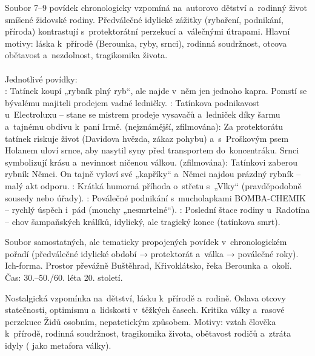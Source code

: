 \documentclass[FGBook.tex]{subfiles}
\begin{document}
\noindent Soubor 7–9 povídek chronologicky vzpomíná na~autorovo dětství a~rodinný život smíšené židovské rodiny. Předválečné idylické zážitky (rybaření, podnikání, příroda) kontrastují s~protektorátní perzekucí a~válečnými útrapami. Hlavní motivy: láska k~přírodě (Berounka, ryby, srnci), rodinná soudržnost, otcova obětavost a~nezdolnost, tragikomika života.\\
\vspace{1pt}\\
Jednotlivé povídky:\\
: Tatínek koupí „rybník plný ryb“, ale najde v~něm jen jednoho kapra. Pomstí se bývalému majiteli prodejem vadné ledničky.  
: Tatínkova podnikavost u~Electroluxu – stane se mistrem prodeje vysavačů a~ledniček díky šarmu a~tajnému obdivu k~paní Irmě.  
 (nejznámější, zfilmována): Za protektorátu tatínek riskuje život (Davidova hvězda, zákaz pohybu) a~s~Proškovým psem Holanem uloví srnce, aby nasytil syny před transportem do~koncentráku. Srnci symbolizují krásu a~nevinnost ničenou válkou.  
 (zfilmována): Tatínkovi zaberou rybník Němci. On tajně vyloví své „kapříky“ a~Němci najdou prázdný rybník – malý akt odporu.  
: Krátká humorná příhoda o~střetu s~„Vlky“ (pravděpodobně sousedy nebo úřady).  
: Poválečné podnikání s~mucholapkami BOMBA-CHEMIK – rychlý úspěch i~pád (mouchy „nesmrtelné“).  
: Poslední štace rodiny u~Radotína – chov šampaňských králíků, idylický, ale tragický konec (tatínkova smrt).

\noindent Soubor samostatných, ale tematicky propojených povídek v~chronologickém pořadí (předválečné idylické období → protektorát a~válka → poválečné roky). Ich-forma. Prostor převážně Buštěhrad, Křivoklátsko, řeka Berounka a~okolí. Čas: 30.–50./60. léta 20. století.

\noindent Nostalgická vzpomínka na~dětství, lásku k~přírodě a~rodině. Oslava otcovy statečnosti, optimismu a~lidskosti v~těžkých časech. Kritika války a~rasové perzekuce Židů osobním, nepatetickým způsobem. Motivy: vztah člověka k~přírodě, rodinná soudržnost, tragikomika života, obětavost rodičů a~ztráta idyly ( jako metafora války).

\end{document}
